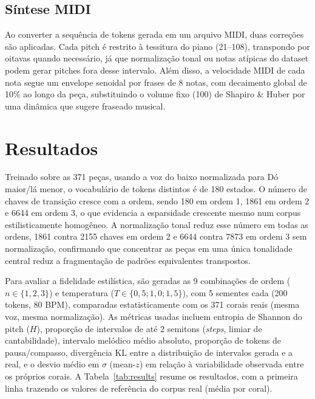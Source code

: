 \documentclass{article}
\begin{document}
\subsection{Síntese MIDI}

Ao converter a sequência de tokens gerada em um arquivo MIDI, duas correções são
aplicadas. Cada pitch é restrito à tessitura do piano (21--108), transpondo por
oitavas quando necessário, já que normalização tonal ou notas atípicas do
dataset podem gerar pitches fora desse intervalo. Além disso, a velocidade MIDI
de cada nota segue um envelope senoidal por frases de 8 notas, com decaimento
global de 10\% ao longo da peça, substituindo o volume fixo (100) de Shapiro \&
Huber por uma dinâmica que sugere fraseado musical.

\section{Resultados}\label{sec:results}

Treinado sobre as 371 peças, usando a voz do baixo normalizada para Dó maior/lá
menor, o vocabulário de tokens distintos é de 180 estados. O número de chaves de
transição cresce com a ordem, sendo 180 em ordem 1, 1861 em ordem 2 e 6644 em
ordem 3, o que evidencia a esparsidade crescente mesmo num corpus
estilisticamente homogêneo. A normalização tonal reduz esse número em todas as
ordens, 1861 contra 2155 chaves em ordem 2 e 6644 contra 7873 em ordem 3 sem
normalização, confirmando que concentrar as peças em uma única tonalidade
central reduz a fragmentação de padrões equivalentes transpostos.

Para avaliar a fidelidade estilística, são geradas as 9 combinações de ordem
($n\in\{1,2,3\}$) e temperatura ($T\in\{0{,}5;1{,}0;1{,}5\}$), com 5 sementes
cada (200 tokens, 80 BPM), comparadas estatisticamente com os 371 corais reais
(mesma voz, mesma normalização). As métricas usadas incluem entropia de Shannon
do pitch ($H$), proporção de intervalos de até 2 semitons (\emph{steps}, limiar
de cantabilidade), intervalo melódico médio absoluto, proporção de tokens de
pausa/compasso, divergência KL entre a distribuição de intervalos gerada e a
real, e o desvio médio em $\sigma$ (mean-$z$) em relação à variabilidade
observada entre os próprios corais. A Tabela~\ref{tab:results} resume os
resultados, com a primeira linha trazendo os valores de referência do corpus
real (média por coral).
\end{document}

